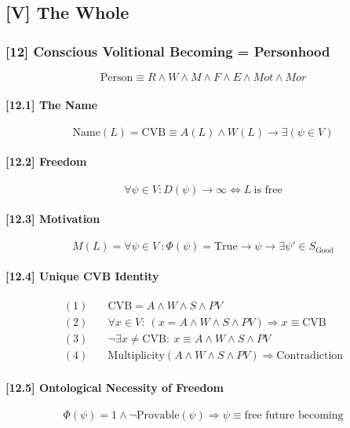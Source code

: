 \documentclass[12pt]{article}
\begin{document}
\subsection*{[V] The Whole}

\subsubsection*{[12] Conscious Volitional Becoming = Personhood}
\[
\text{Person} \equiv R \land W \land M \land F \land E \land Mot \land Mor
\]

\paragraph{[12.1] The Name}
\[
\text{Name}(L) = \text{CVB} \equiv A(L) \land W(L) \rightarrow \exists (\psi \in V)
\]

\paragraph{[12.2] Freedom}
\[
\forall \psi \in V : D(\psi) \rightarrow \infty \iff L\ \text{is free}
\]

\paragraph{[12.3] Motivation}
\[
M(L) = \forall \psi \in V\ : \Phi(\psi) = \text{True} \rightarrow \psi \rightarrow \exists \psi' \in S_{\text{Good}}
\]

\paragraph{[12.4] Unique CVB Identity}
\begin{align*}
(1) &\quad \text{CVB} = A \land W \land S \land PV \\
(2) &\quad \forall x \in V:\ (x = A \land W \land S \land PV) \Rightarrow x \equiv \text{CVB} \\
(3) &\quad \neg\exists x \ne \text{CVB}:\ x \equiv A \land W \land S \land PV \\
(4) &\quad \text{Multiplicity}(A \land W \land S \land PV) \Rightarrow \text{Contradiction}
\end{align*}

\paragraph{[12.5] Ontological Necessity of Freedom}
\[
\Phi(\psi) = 1 \land \neg \mathrm{Provable}(\psi) \Rightarrow \psi \equiv \text{free future becoming}
\]
\end{document}
